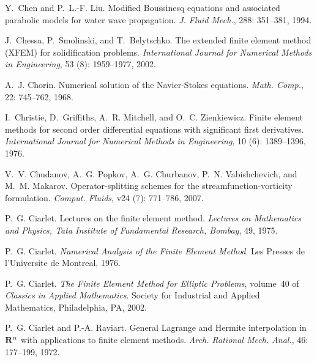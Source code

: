 \begin{thebibliography}{467}
Y.~Chen and P.~L.-F. Liu.
\newblock Modified {B}oussinesq equations and associated parabolic models for
  water wave propagation.
\newblock \emph{J. Fluid Mech.}, 288: 351--381, 1994.

J.~Chessa, P.~Smolinski, and T.~Belytschko.
\newblock The extended finite element method {(XFEM)} for solidification
  problems.
\newblock \emph{International Journal for Numerical Methods in Engineering},
  53 (8): 1959--1977, 2002.

A.~J. Chorin.
\newblock Numerical solution of the {N}avier-{S}tokes equations.
\newblock \emph{Math. Comp.}, 22: 745--762, 1968.

I.~Christie, D.~Griffiths, A.~R. Mitchell, and O.~C. Zienkiewicz.
\newblock Finite element methods for second order differential equations with
  significant first derivatives.
\newblock \emph{International Journal for Numerical Methods in Engineering},
  10 (6): 1389--1396, 1976.

V.~V. Chudanov, A.~G. Popkov, A.~G. Churbanov, P.~N. Vabishchevich, and M.~M.
  Makarov.
\newblock Operator-splitting schemes for the streamfunction-vorticity
  formulation.
\newblock \emph{Comput. Fluids}, v24 (7): 771--786, 2007.

P.~G. Ciarlet.
\newblock Lectures on the finite element method.
\newblock \emph{Lectures on Mathematics and Physics, Tata Institute of
  Fundamental Research, Bombay}, 49, 1975.

P.~G. Ciarlet.
\newblock \emph{Numerical Analysis of the Finite Element Method}.
\newblock Les Presses de l'Universite de Montreal, 1976.

P.~G. Ciarlet.
\newblock \emph{The Finite Element Method for Elliptic Problems}, volume~40 of
  \emph{Classics in Applied Mathematics}.
\newblock Society for Industrial and Applied Mathematics, Philadelphia, PA,
  2002.

P.~G. Ciarlet and P.-A. Raviart.
\newblock General {L}agrange and {H}ermite interpolation in {${\bf R}\sp{n}$}
  with applications to finite element methods.
\newblock \emph{Arch. Rational Mech. Anal.}, 46: 177--199, 1972.


\end{thebibliography}
